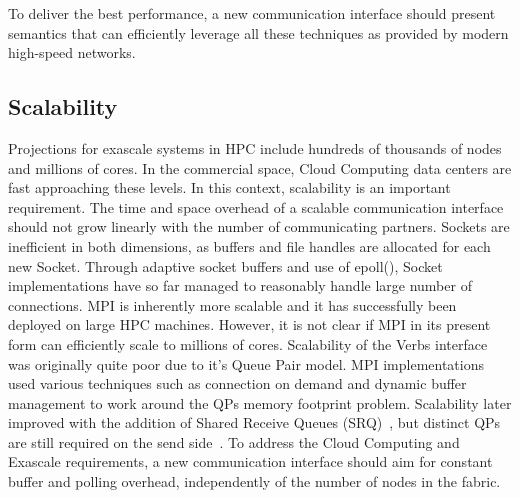 To deliver the best performance, a new communication interface should present
semantics that can efficiently leverage all these techniques as provided by 
modern high-speed networks.

\subsection{Scalability}
Projections for exascale systems in HPC include hundreds of thousands of nodes 
and millions of cores\cite{dongarra:exascale-talk-2010}. In the commercial 
space, Cloud Computing data centers are fast approaching these levels. 
In this context, scalability is an important requirement. The time and space 
overhead of a scalable communication interface should not grow linearly with 
the number of communicating partners. Sockets are inefficient in both 
dimensions, as buffers and file handles are allocated for each new Socket. 
Through adaptive socket buffers and use of epoll(), Socket implementations 
have so far managed to reasonably handle large number of connections. 
MPI is inherently more scalable and it has successfully been deployed on large 
HPC machines. However, it is not clear if MPI in its present form can 
efficiently scale to millions of cores. 
Scalability of the Verbs interface was originally quite poor due to it's Queue 
Pair model. MPI implementations used various techniques such as connection on 
demand\cite{Shipman_infinibandscalability} and dynamic buffer management 
to work around the QPs memory footprint problem. Scalability later
improved  with the addition of Shared Receive Queues 
(SRQ)~\cite{shipman07:_inves_infin}, but distinct QPs are still  
required on the send side~\cite{Shipman:2008:XIS:1431669.1431683}. To
address the Cloud Computing and Exascale requirements, a new
communication interface should aim for constant buffer and polling
overhead, independently of the number of nodes in the fabric. 

